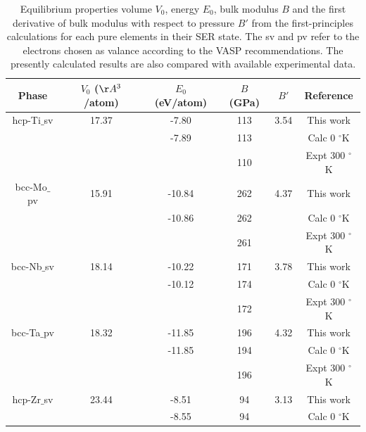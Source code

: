 \newpage
\begin{table}[H]
	\caption{Equilibrium properties volume $V_{0}$, energy $E_{0}$, bulk modulus $B$ and the first derivative of bulk modulus with respect to pressure $B'$ from the first-principles calculations for each pure elements in their SER state. The sv and pv refer to the electrons chosen as valance according to the VASP recommendations. The presently calculated results are also compared with available experimental data.}
	\centering
	\begin{tabular}{ c c c c c c }
		\hline
		Phase & $V_{0}$ ($\AA^{3}$/atom) & $E_{0}$ (eV/atom) & $B$ (GPa) & $B'$ & Reference \\
		\hline
		hcp-Ti$\_$sv & 17.37 & -7.80 & 113 & 3.54 & This work\\
                 & & -7.89 & 113 & & Calc 0 $^{\circ}$K \cite{Schmitz-Pranghe1968_792,MaterialsProject}\\
                 & & & 110 & & Expt 300 $^{\circ}$K \cite{WolframResearch}\\
        bcc-Mo$\_$pv & 15.91 & -10.84 & 262 & 4.37 & This work\\
                 & & -10.86 & 262 & & Calc 0 $^{\circ}$K \cite{MaterialsProject,Chen_Y2009_794}\\        
                 & & & 261 & & Expt 300 $^{\circ}$K \cite{Bolef1961}\\
        bcc-Nb$\_$sv & 18.14 & -10.22 & 171 & 3.78 & This work\\
                 & & -10.12 & 174 & & Calc 0 $^{\circ}$K \cite{MaterialsProject,Neuburger1936_127}\\           
                 & & & 172 & & Expt 300 $^{\circ}$K \cite{Bolef1961} \\
        bcc-Ta$\_$pv & 18.32 & -11.85 & 196 & 4.32 & This work\\
                 & & -11.85 & 194 & & Calc 0 $^{\circ}$K \cite{MaterialsProject,Neuburger1936_262}\\
                 & & & 196 & & Expt 300 $^{\circ}$K \cite{Bolef1961}\\                     
        hcp-Zr$\_$sv & 23.44& -8.51 & 94 & 3.13 & This work\\
                 & & -8.55 & 94 & & Calc 0 $^{\circ}$K \cite{MaterialsProject,Treco1953_964,Bergerhoff1983,Karlsruhe}\\
		\hline
	\end{tabular}
	\label{Ch3-table:pspureele}
\end{table}

